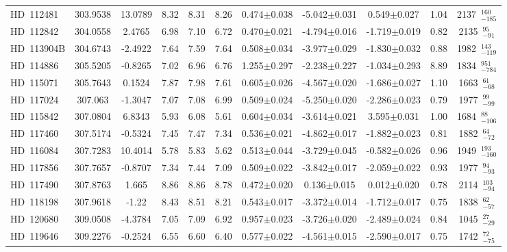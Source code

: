 {\begin{longtable}{lcccccccccc}
HD~112481 & 303.9538 & 13.0789 & 8.32 & 8.31 & 8.26 & 0.474$\pm$0.038 & -5.042$\pm$0.031 & 0.549$\pm$0.027 & 1.04 & 2137~$_{-185}^{160}$ \\
\noalign{\smallskip}
HD~112842 & 304.0558 & 2.4765 & 6.98 & 7.10 & 6.72 & 0.470$\pm$0.021 & -4.794$\pm$0.016 & -1.719$\pm$0.019 & 0.82 & 2135~$_{-91}^{95}$ \\
\noalign{\smallskip}
HD~113904B & 304.6743 & -2.4922 & 7.64 & 7.59 & 7.64 & 0.508$\pm$0.034 & -3.977$\pm$0.029 & -1.830$\pm$0.032 & 0.88 & 1982~$_{-119}^{143}$ \\
\noalign{\smallskip}
HD~114886 & 305.5205 & -0.8265 & 7.02 & 6.96 & 6.76 & 1.255$\pm$0.297 & -2.238$\pm$0.227 & -1.034$\pm$0.293 & 8.89 & 1834~$_{-784}^{951}$ \\
\noalign{\smallskip}
HD~115071 & 305.7643 & 0.1524 & 7.87 & 7.98 & 7.61 & 0.605$\pm$0.026 & -4.567$\pm$0.020 & -1.686$\pm$0.027 & 1.10 & 1663~$_{-68}^{61}$ \\
\noalign{\smallskip}
HD~117024 & 307.063 & -1.3047 & 7.07 & 7.08 & 6.99 & 0.509$\pm$0.024 & -5.250$\pm$0.020 & -2.286$\pm$0.023 & 0.79 & 1977~$_{-99}^{99}$ \\
\noalign{\smallskip}
HD~115842 & 307.0804 & 6.8343 & 5.93 & 6.08 & 5.61 & 0.604$\pm$0.034 & -3.614$\pm$0.021 & 3.595$\pm$0.031 & 1.00 & 1684~$_{-106}^{88}$ \\
\noalign{\smallskip}
HD~117460 & 307.5174 & -0.5324 & 7.45 & 7.47 & 7.34 & 0.536$\pm$0.021 & -4.862$\pm$0.017 & -1.882$\pm$0.023 & 0.81 & 1882~$_{-72}^{64}$ \\
\noalign{\smallskip}
HD~116084 & 307.7283 & 10.4014 & 5.78 & 5.83 & 5.62 & 0.513$\pm$0.044 & -3.729$\pm$0.045 & -0.582$\pm$0.026 & 0.96 & 1949~$_{-160}^{193}$ \\
\noalign{\smallskip}
HD~117856 & 307.7657 & -0.8707 & 7.34 & 7.44 & 7.09 & 0.509$\pm$0.022 & -3.842$\pm$0.017 & -2.059$\pm$0.022 & 0.93 & 1977~$_{-93}^{94}$ \\
\noalign{\smallskip}
HD~117490 & 307.8763 & 1.665 & 8.86 & 8.86 & 8.78 & 0.472$\pm$0.020 & 0.136$\pm$0.015 & 0.012$\pm$0.020 & 0.78 & 2114~$_{-94}^{103}$ \\
\noalign{\smallskip}
HD~118198 & 307.9618 & -1.22 & 8.43 & 8.51 & 8.21 & 0.543$\pm$0.017 & -3.372$\pm$0.014 & -1.712$\pm$0.017 & 0.75 & 1838~$_{-57}^{62}$ \\
\noalign{\smallskip}
HD~120680 & 309.0508 & -4.3784 & 7.05 & 7.09 & 6.92 & 0.957$\pm$0.023 & -3.726$\pm$0.020 & -2.489$\pm$0.024 & 0.84 & 1045~$_{-29}^{27}$ \\
\noalign{\smallskip}
HD~119646 & 309.2276 & -0.2524 & 6.55 & 6.60 & 6.40 & 0.577$\pm$0.022 & -4.561$\pm$0.015 & -2.590$\pm$0.017 & 0.75 & 1742~$_{-75}^{72}$ \\

\end{longtable}}
